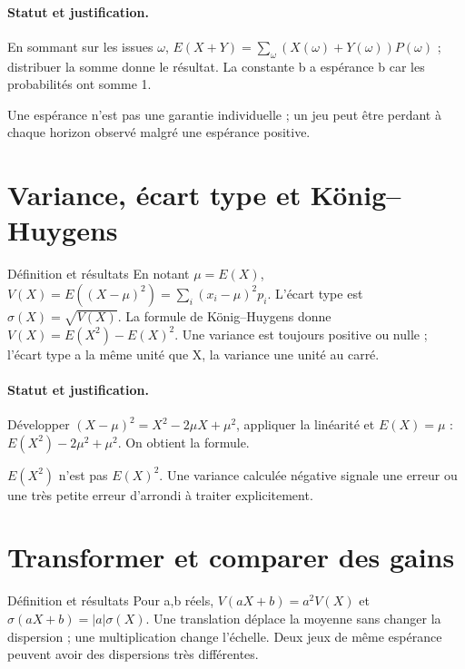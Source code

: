 \paragraph{Statut et justification.} En sommant sur les issues $\omega$, $E(X+Y)=\sum_\omega(X(\omega)+Y(\omega))P(\omega)$ ; distribuer la somme donne le résultat. La constante b a espérance b car les probabilités ont somme 1.
\label{C08-EX2}
\begin{erreur}Une espérance n’est pas une garantie individuelle ; un jeu peut être perdant à chaque horizon observé malgré une espérance positive.\end{erreur}
\label{C08-AP2}
\section{Variance, écart type et König–Huygens}\label{C08-U3}
\begin{repere}{Définition et résultats}
En notant $\mu=E(X)$, $V(X)=E((X-\mu)^2)=\sum_i(x_i-\mu)^2p_i$. L’écart type est $\sigma(X)=\sqrt{V(X)}$. La formule de König–Huygens donne $V(X)=E(X^2)-E(X)^2$. Une variance est toujours positive ou nulle ; l’écart type a la même unité que X, la variance une unité au carré.
\end{repere}
\paragraph{Statut et justification.} Développer $(X-\mu)^2=X^2-2\mu X+\mu^2$, appliquer la linéarité et $E(X)=\mu$ : $E(X^2)-2\mu^2+\mu^2$. On obtient la formule.
\label{C08-EX3}
\begin{erreur}$E(X^2)$ n’est pas $E(X)^2$. Une variance calculée négative signale une erreur ou une très petite erreur d’arrondi à traiter explicitement.\end{erreur}
\label{C08-AP3}
\section{Transformer et comparer des gains}\label{C08-U4}
\begin{repere}{Définition et résultats}
Pour a,b réels, $V(aX+b)=a^2V(X)$ et $\sigma(aX+b)=|a|\sigma(X)$. Une translation déplace la moyenne sans changer la dispersion ; une multiplication change l’échelle. Deux jeux de même espérance peuvent avoir des dispersions très différentes.
\end{repere}
